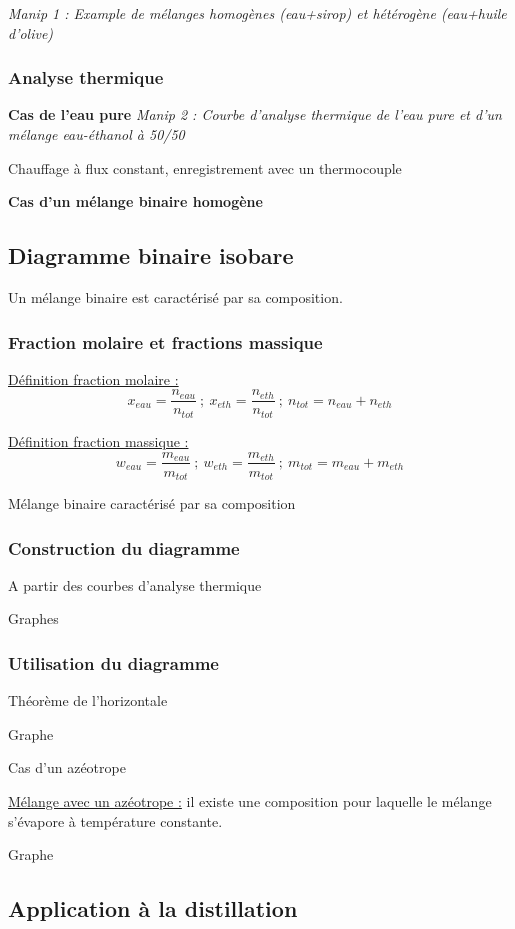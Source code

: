 \documentclass{article}%
\begin{document}
\textit{Manip 1 : Example de mélanges homogènes (eau+sirop) et hétérogène (eau+huile d'olive)} 
\subsubsection{Analyse thermique}
\textbf{Cas de l'eau pure}
\textit{Manip 2 : Courbe d'analyse thermique de l'eau pure et d'un mélange eau-éthanol à 50/50}

Chauffage à flux constant, enregistrement avec un thermocouple

\textbf{Cas d'un mélange binaire homogène}
\subsection{Diagramme binaire isobare}
Un mélange binaire est caractérisé par sa composition.

\subsubsection{Fraction molaire et fractions massique}
\underline{Définition fraction molaire :} \[x_{eau}=\frac{n_{eau}}{n_{tot}}~;~x_{eth}=\frac{n_{eth}}{n_{tot}}~;~n_{tot}=n_{eau}+n_{eth}\]

\underline{Définition fraction massique :} \[w_{eau}=\frac{m_{eau}}{m_{tot}}~;~w_{eth}=\frac{m_{eth}}{m_{tot}}~;~m_{tot}=m_{eau}+m_{eth}\]

Mélange binaire caractérisé par sa composition

\subsubsection{Construction du diagramme}
A partir des courbes d'analyse thermique

Graphes

\subsubsection{Utilisation du diagramme}
Théorème de l'horizontale

Graphe

Cas d'un azéotrope

\underline{Mélange avec un azéotrope :} il existe une composition pour laquelle le mélange s'évapore à température constante.

Graphe

\subsection{Application à la distillation}
\end{document}
